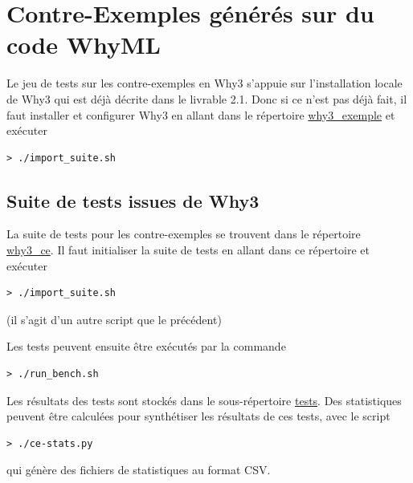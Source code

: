 \documentclass[a4paper,11pt]{article}
\begin{document}

\section{Contre-Exemples générés sur du code  WhyML}

Le jeu de tests sur les contre-exemples en Why3 s'appuie sur
l'installation locale de Why3 qui est déjà décrite dans le livrable
2.1. Donc si ce n'est pas déjà fait, il faut installer et configurer Why3 en allant dans le répertoire \url{why3_exemple} et exécuter
\begin{lstlisting}
> ./import_suite.sh
\end{lstlisting}

\subsection{Suite de tests issues de Why3}

La suite de tests pour les contre-exemples se trouvent dans le
répertoire \url{why3_ce}. Il faut initialiser la suite de tests en
allant dans ce répertoire et exécuter
\begin{lstlisting}
> ./import_suite.sh
\end{lstlisting}
(il s'agit d'un autre script que le précédent)

Les tests peuvent ensuite être exécutés par la commande
\begin{lstlisting}
> ./run_bench.sh
\end{lstlisting}
Les résultats des tests sont stockés dans le sous-répertoire
\url{tests}. Des statistiques peuvent être calculées pour synthétiser
les résultats de ces tests, avec le script
\begin{lstlisting}
> ./ce-stats.py
\end{lstlisting}
qui génère des fichiers de statistiques au format CSV.
\end{document}
